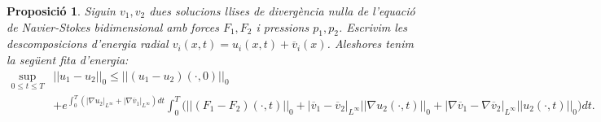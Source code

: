 \documentclass{article}
\numberwithin{equation}{section}
\newtheorem{proposicio}{Proposici\'{o}}[section]
\begin{document}
%
%
\begin{proposicio}
Siguin $v_1,v_2$ dues solucions llises de diverg\`{e}ncia nul\textperiodcentered la de l'equaci\'{o} de Navier-Stokes bidimensional amb forces $F_1,F_2$ i pressions $p_1,p_2$. Escrivim les descomposicions d'energia radial $v_i(x,t)=u_i(x,t)+\overline v_i(x)$. Aleshores tenim la seg\"{u}ent fita d'energia:
\begin{equation}
\begin{split}
\sup_{0\leq t\leq T}&||u_1-u_2||_0\leq||(u_1-u_2)(\cdot,0)||_0\\
&+e^{\int_0^T(|\nabla u_2|_{L^{\infty}}+|\nabla\overline v_1|_{L^{\infty}})dt}\int_0^T\big(||(F_1-F_2)(\cdot,t)||_0+|\overline v_1-\overline v_2|_{L^{\infty}}||\nabla u_2(\cdot,t)||_0+|\nabla\overline v_1-\nabla\overline v_2|_{L^{\infty}}||u_2(\cdot,t)||_0\big)dt.
\end{split}
\end{equation}
\end{proposicio}
\end{document}
